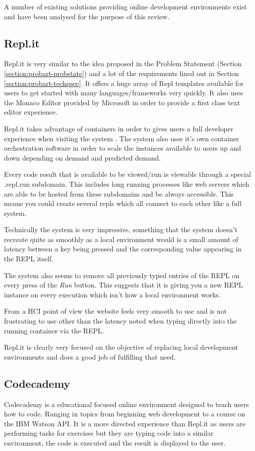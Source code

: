 A number of existing solutions providing online development environments exist and have been analysed for the purpose of this review.

\subsection{Repl.it}

Repl.it is very similar to the idea proposed in the Problem Statement (Section \ref{section:probart-probstate}) and a lot of the requirements lined out in Section \ref{section:probart-techspec}. It offers a huge array of Repl templates available for users to get started with many languages/frameworks very quickly. It also uses the Monaco Editor provided by Microsoft in order to provide a first class text editor experience.

Repl.it takes advantage of containers in order to gives users a full developer experience when visiting the system \cite{replit-containers}. The system also uses it's own container orchestration software in order to scale the instances available to users up and down depending on demand and predicted demand.

Every code result that is available to be viewed/run is viewable through a special .repl.run subdomain. This includes long running processes like web servers which are able to be hosted from these subdomains and be always accessible. This means you could create several repls which all connect to each other like a full system.

Technically the system is very impressive, something that the system doesn't recreate quite as smoothly as a local environment would is a small amount of latency between a key being pressed and the corresponding value appearing in the REPL itself.

The system also seems to remove all previously typed entries of the REPL on every press of the \textit{Run} button. This suggests that it is giving you a new REPL instance on every execution which isn't how a local environment works.

From a HCI point of view the website feels very smooth to use and is not frustrating to use other than the latency noted when typing directly into the running container via the REPL.

Repl.it is clearly very focused on the objective of replacing local development environments and does a good job of fulfilling that need.

\subsection{Codecademy}
Codecademy is a educational focused online environment designed to teach users how to code. Ranging in topics from beginning web development to a course on the IBM Watson API. It is a more directed experience than Repl.it as users are performing tasks for exercises but they are typing code into a similar environment, the code is executed and the result is displayed to the user.

